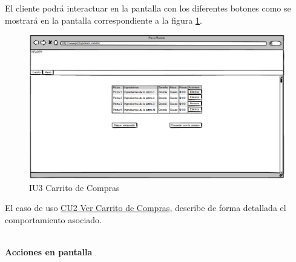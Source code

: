 El cliente podrá interactuar en la pantalla con los diferentes botones como se mostrará en la pantalla correspondiente a la figura \ref{IU3}.
\begin{figure}[h]
	
	\begin{center}				
		
		\includegraphics[scale=0.50]{./imagenes/IUs/RegistroSolicitantes/iu1-IniciarSesion/IU3-CarritoDeCompras.png}
		\caption{IU3 Carrito de Compras}
		\label{IU3}
		
	\end{center}
	
\end{figure}


El caso de uso \hyperlink{CU2}{CU2 Ver Carrito de Compras}, describe de forma detallada el comportamiento asociado.

\noindent \textbf{\\Acciones en pantalla}

